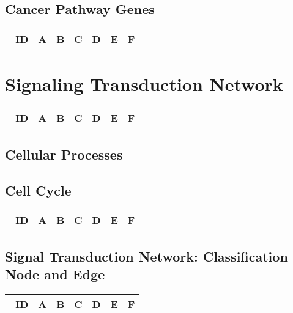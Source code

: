 \documentclass[preprint, 8pt]{elsarticle}
\theoremstyle{definition}
\begin{document}
\subsection{Cancer Pathway Genes}

\begin{table}[H]\centering
\begin{tabular}{p{1cm}p{1cm}p{1cm}p{1cm}p{1cm}p{1cm}p{4cm}}\
ID & A & B & C & D & E & F \\
\hline
\hline
\end{tabular}
\end{table}

\section{Signaling Transduction Network}

\begin{table}[H]\centering
\begin{tabular}{p{1cm}p{1cm}p{1cm}p{1cm}p{1cm}p{1cm}p{4cm}}\
ID & A & B & C & D & E & F \\
\hline
\hline
\end{tabular}
\end{table}

\subsection{Cellular Processes}

\subsection{Cell Cycle}

\begin{table}[H]\centering
\begin{tabular}{p{1cm}p{1cm}p{1cm}p{1cm}p{1cm}p{1cm}p{4cm}}\
ID & A & B & C & D & E & F \\
\hline
\hline
\end{tabular}
\end{table}

\subsection{Signal Transduction Network: Classification Node and Edge}

\begin{table}[H]\centering
\begin{tabular}{p{1cm}p{1cm}p{1cm}p{1cm}p{1cm}p{1cm}p{4cm}}\
ID & A & B & C & D & E & F \\
\hline
\hline
\end{tabular}
\end{table}
\end{document}
